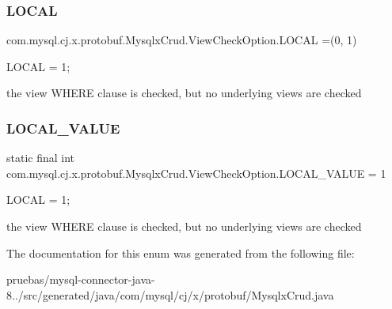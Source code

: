 \subsubsection{\texorpdfstring{L\+O\+C\+AL}{LOCAL}}
{\footnotesize\ttfamily com.\+mysql.\+cj.\+x.\+protobuf.\+Mysqlx\+Crud.\+View\+Check\+Option.\+L\+O\+C\+AL =(0, 1)}

{\ttfamily L\+O\+C\+AL = 1;}


\begin{DoxyPre}
the view WHERE clause is checked, but no underlying views are checked
\end{DoxyPre}
 \mbox{\label{enumcom_1_1mysql_1_1cj_1_1x_1_1protobuf_1_1_mysqlx_crud_1_1_view_check_option_a2cdae5757280587dd0588a361144d36b}} 
\subsubsection{\texorpdfstring{L\+O\+C\+A\+L\+\_\+\+V\+A\+L\+UE}{LOCAL\_VALUE}}
{\footnotesize\ttfamily  static  final int com.\+mysql.\+cj.\+x.\+protobuf.\+Mysqlx\+Crud.\+View\+Check\+Option.\+L\+O\+C\+A\+L\+\_\+\+V\+A\+L\+UE = 1\hspace{0.3cm}{\ttfamily [static]}}

{\ttfamily L\+O\+C\+AL = 1;}


\begin{DoxyPre}
the view WHERE clause is checked, but no underlying views are checked
\end{DoxyPre}
 

The documentation for this enum was generated from the following file\+:\begin{DoxyCompactItemize}
\item 
pruebas/mysql-\/connector-\/java-\/8../src/generated/java/com/mysql/cj/x/protobuf/Mysqlx\+Crud.\+java\end{DoxyCompactItemize}
